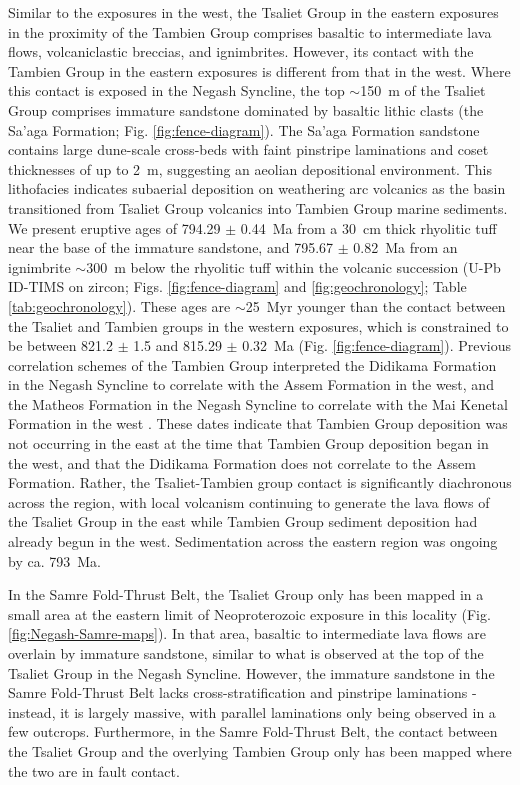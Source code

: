 Similar to the exposures in the west, the Tsaliet Group in the eastern exposures in the proximity of the Tambien Group comprises basaltic to intermediate lava flows, volcaniclastic breccias, and ignimbrites. However, its contact with the Tambien Group in the eastern exposures is different from that in the west. Where this contact is exposed in the Negash Syncline, the top $\sim$150~m of the Tsaliet Group comprises immature sandstone dominated by basaltic lithic clasts (the Sa'aga Formation; Fig. \ref{fig:fence-diagram}). The Sa'aga Formation sandstone contains large dune-scale cross-beds with faint pinstripe laminations and coset thicknesses of up to 2~m, suggesting an aeolian depositional environment. This lithofacies indicates subaerial deposition on weathering arc volcanics as the basin transitioned from Tsaliet Group volcanics into Tambien Group marine sediments. We present eruptive ages of 794.29 $\pm$ 0.44~Ma from a 30~cm thick rhyolitic tuff near the base of the immature sandstone, and 795.67 $\pm$ 0.82~Ma from an ignimbrite $\sim$300~m below the rhyolitic tuff within the volcanic succession (U-Pb ID-TIMS on zircon; Figs. \ref{fig:fence-diagram} and \ref{fig:geochronology}; Table \ref{tab:geochronology}). These ages are $\sim$25~Myr younger than the contact between the Tsaliet and Tambien groups in the western exposures, which is constrained to be between 821.2 $\pm$ 1.5 and 815.29 $\pm$ 0.32~Ma (Fig. \ref{fig:fence-diagram}). Previous correlation schemes of the Tambien Group interpreted the Didikama Formation in the Negash Syncline to correlate with the Assem Formation in the west, and the Matheos Formation in the Negash Syncline to correlate with the Mai Kenetal Formation in the west \citep{Alene2006a, Miller2009a}. These dates indicate that Tambien Group deposition was not occurring in the east at the time that Tambien Group deposition began in the west, and that the Didikama Formation does not correlate to the Assem Formation. Rather, the Tsaliet-Tambien group contact is significantly diachronous across the region, with local volcanism continuing to generate the lava flows of the Tsaliet Group in the east while Tambien Group sediment deposition had already begun in the west. Sedimentation across the eastern region was ongoing by ca. 793~Ma.

In the Samre Fold-Thrust Belt, the Tsaliet Group only has been mapped in a small area at the eastern limit of Neoproterozoic exposure in this locality (Fig. \ref{fig:Negash-Samre-maps}). In that area, basaltic to intermediate lava flows are overlain by immature sandstone, similar to what is observed at the top of the Tsaliet Group in the Negash Syncline. However, the immature sandstone in the Samre Fold-Thrust Belt lacks cross-stratification and pinstripe laminations - instead, it is largely massive, with parallel laminations only being observed in a few outcrops. Furthermore, in the Samre Fold-Thrust Belt, the contact between the Tsaliet Group and the overlying Tambien Group only has been mapped where the two are in fault contact.

